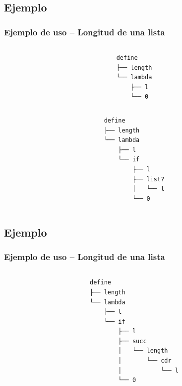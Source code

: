 \documentclass[xcolor=x11names,compress]{beamer}
\renewcommand{\(}{\begin{columns}}
\renewcommand{\)}{\end{columns}}
\newcommand{\<}[1]{\begin{column}{#1}}
\renewcommand{\>}{\end{column}}
\begin{document}
\subsection{Ejemplo}
\begin{frame}[fragile]
    \frametitle{Ejemplo de uso -- Longitud de una lista}\pause
    \begin{columns}
        \begin{column}{.50\linewidth}
        \begin{block}
            \codeLengthExampleA
        \end{block}
        \end{column}\pause
        \begin{column}{.50\linewidth}
        \begin{verbatim}
define
├── length
└── lambda
    ├── l
    └── 0
        \end{verbatim}
        \end{column}
    \end{columns}\pause

    \begin{columns}
        \begin{column}{.50\linewidth}
        \begin{block}
            \codeLengthExampleB
        \end{block}
        \end{column}\pause
        \begin{column}{.50\linewidth}
        \begin{verbatim}
define
├── length
└── lambda
    ├── l
    └── if
        ├── l
        ├── list?
        │   └── l
        └── 0
        \end{verbatim}
        \end{column}
    \end{columns}
\end{frame}


\subsection{Ejemplo}
\begin{frame}[fragile]
    \frametitle{Ejemplo de uso -- Longitud de una lista}
    \begin{columns}
        \begin{column}{.50\linewidth}
        \begin{block}
            \codeLengthExampleC
        \end{block}
        \end{column}\pause
        \begin{column}{.50\linewidth}
        \begin{verbatim}
define
├── length
└── lambda
    ├── l
    └── if
        ├── l
        ├── succ
        │   └── length
        │       └── cdr
        │           └── l
        └── 0
        \end{verbatim}
        \end{column}
    \end{columns}
\end{frame}
\end{document}
